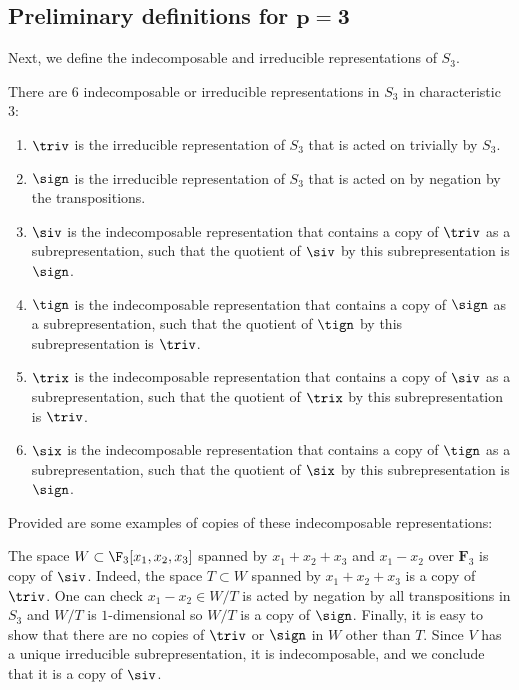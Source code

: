 \subsection[Preliminary definitions for p=3]{Preliminary definitions for $\boldsymbol{p=3}$}

Next, we define the indecomposable and irreducible representations of $S_3$.

\begin{Proposition}
 There are $6$ indecomposable or irreducible representations in $S_3$ in characteristic $3$:
 \begin{enumerate}\itemsep=0pt
 \item[$1$.] $\triv$ is the irreducible representation of $S_3$ that is acted on trivially by $S_3$.
 \item[$2$.] $\sign$ is the irreducible representation of $S_3$ that is acted on by negation by the transpositions.
 \item[$3$.] $\siv$ is the indecomposable representation that contains a copy of $\triv$ as a subrepresentation, such that the quotient of $\siv$ by this subrepresentation is $\sign$.
 \item[$4$.] $\tign$ is the indecomposable representation that contains a copy of $\sign$ as a subrepresentation, such that the quotient of $\tign$ by this subrepresentation is $\triv$.
 \item[$5$.] $\trix$ is the indecomposable representation that contains a copy of $\siv$ as a subrepresentation, such that the quotient of $\trix$ by this subrepresentation is $\triv$.
 \item[$6$.] $\six$ is the indecomposable representation that contains a copy of $\tign$ as a subrepresentation, such that the quotient of $\six$ by this subrepresentation is $\sign$.
 \end{enumerate}
\end{Proposition}

Provided are some examples of copies of these indecomposable representations:

\begin{Example}\label{exSiv}
 The space $W\subset\F_3[x_1,x_2,x_3]$ spanned by $x_1+x_2+x_3$ and $x_1-x_2$ over $\mathbf{F}_3$ is copy of $\siv$. Indeed, the space $T\subset W$ spanned by $x_1+x_2+x_3$ is a copy of $\triv$. One can check $x_1-x_2\in W/T$ is acted by negation by all transpositions in $S_3$ and $W/T$ is $1$-dimensional so $W/T$ is a copy of $\sign$. Finally, it is easy to show that there are no copies of $\triv$ or $\sign$ in $W$ other than $T$. Since $V$ has a unique irreducible subrepresentation, it is indecomposable, and we conclude that it is a copy of $\siv$.
\end{Example}

